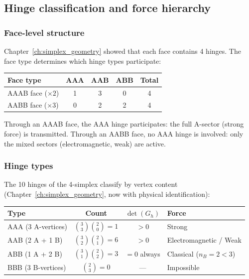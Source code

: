 \documentclass[12pt]{article}
\theoremstyle{remark}
\theoremstyle{definition}
\begin{document}
\subsection{Hinge classification and force hierarchy}

\subsubsection{Face-level structure}

Chapter~\ref{ch:simplex_geometry} showed that each face contains 4 hinges. The face type determines which hinge types participate:

\begin{center}
\begin{tabular}{lcccc}
\hline
Face type & AAA & AAB & ABB & Total \\
\hline
AAAB face ($\times 2$) & 1 & 3 & 0 & 4 \\
AABB face ($\times 3$) & 0 & 2 & 2 & 4 \\
\hline
\end{tabular}
\end{center}

Through an AAAB face, the AAA hinge participates: the full A-sector (strong force) is transmitted. Through an AABB face, no AAA hinge is involved: only the mixed sectors (electromagnetic, weak) are active.

\subsubsection{Hinge types}

The 10 hinges of the 4-simplex classify by vertex content (Chapter~\ref{ch:simplex_geometry}, now with physical identification):

\begin{center}
\begin{tabular}{lccl}
\hline
Type & Count & $\det(G_h)$ & Force \\
\hline
AAA (3 A-vertices) & $\binom{3}{3}\binom{2}{0} = 1$ & $> 0$ & Strong \\
AAB (2 A + 1 B) & $\binom{3}{2}\binom{2}{1} = 6$ & $> 0$ & Electromagnetic / Weak \\
ABB (1 A + 2 B) & $\binom{3}{1}\binom{2}{2} = 3$ & $= 0$ always & Classical ($n_B = 2 < 3$) \\
BBB (3 B-vertices) & $\binom{2}{3} = 0$ & --- & Impossible \\
\hline
\end{tabular}
\end{center}
\end{document}
